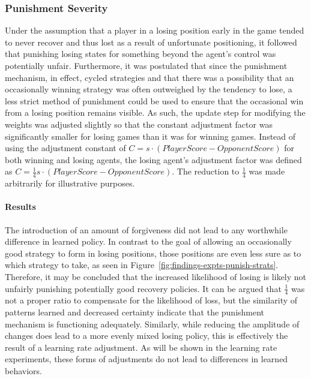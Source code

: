 
\subsubsection*{Punishment Severity}
\label{sec:findings-expts-punishments}

Under the assumption that a player in a losing position
early in the game tended to never recover and thus lost as a result of
unfortunate positioning,
it followed that punishing losing states for something beyond the agent's
control was potentially unfair.
%
Furthermore,
it was postulated that since the punishment mechanism, in effect, cycled
strategies
and that there was a possibility that an occasionally winning strategy was often
outweighed by the tendency to lose,
a less strict method of punishment could be used to ensure that the occasional
win from a losing position remains visible.
%
As such,
the update step for modifying the weights was adjusted slightly
so that the constant adjustment factor was significantly smaller for losing
games than it was for winning games.
%
Instead of using the adjustment constant of
$C = s \cdot (\textit{PlayerScore} - \textit{OpponentScore})$
for both winning and losing agents,
the losing agent's adjustment factor was defined as
$C = \frac{1}{4} s \cdot (\textit{PlayerScore} - \textit{OpponentScore})$.
%
The reduction to $\frac{1}{4}$ was made arbitrarily for illustrative purposes.

\paragraph*{Results}

The introduction of an amount of forgiveness did not lead to any worthwhile
difference in learned policy.
%
In contrast to the goal of allowing an occasionally good strategy to form
in losing positions,
those positions are even less sure as to which strategy to take,
as seen in Figure~\ref{fig:findings-expts-punish-strats}.
%
Therefore,
it may be concluded that the increased likelihood of losing is 
likely not unfairly punishing potentially good recovery policies.
%
It can be argued that $\frac{1}{4}$ was not a proper ratio
to compensate for the likelihood of loss,
but the similarity of patterns learned and decreased certainty
indicate that the punishment mechanism is functioning adequately.
%
Similarly,
while reducing the amplitude of changes
does lead to a more evenly mixed losing policy,
this is effectively the result of a learning rate adjustment.
%
As will be shown in the learning rate experiments,
these forms of adjustments do not lead to differences in learned behaviors.



